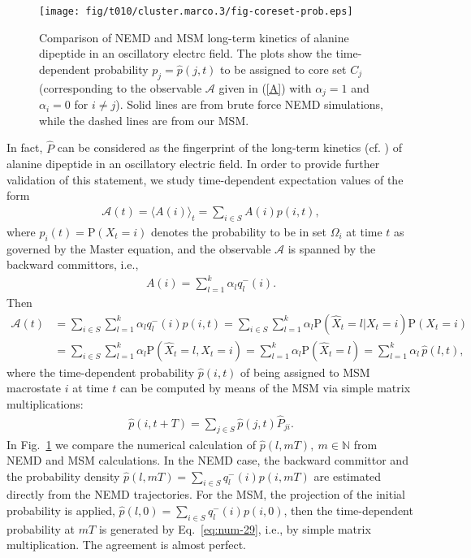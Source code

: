 \documentclass[aps, pre, preprint,unsortedaddress,a4paper,onecolumn]{revtex4}
\newcommand{\bwd}[0]{-}
\newcommand{\prob}{\textrm{P}}
\begin{document}
\begin{figure}
  \centering
  \texttt{[image: fig/t010/cluster.marco.3/fig-coreset-prob.eps]}
  \caption{Comparison of NEMD and MSM long-term kinetics of alanine dipeptide in an oscillatory electrc field. The plots show the time-dependent probability $p_j=\hat p(j,t)$ to be assigned to core set $C_j$ (corresponding to the observable $\mathcal A$ given in (\ref{A}) with $\alpha_j=1$ and $\alpha_i=0$ for $i\not= j$). Solid lines are from brute force NEMD simulations, while the dashed lines are from our MSM.}
  \label{fig:num-7}
\end{figure}

In fact, $\hat{P}$ can be considered as the fingerprint of the long-term kinetics (cf. \cite{A19-39,PrinzKellerNoe_PCCP11_Perspective}) of alanine dipeptide in an oscillatory electric field.
In order to provide further validation of this statement, we study  time-dependent expectation values of
the form
\begin{align}
  \mathcal A(t) = \langle A(i)\rangle_t = \sum_{i\in S} A(i) p(i,t),
\end{align}
where $p_i(t)=\prob(X_t=i)$ denotes the probability to be in set $\Omega_i$ at time $t$ as governed by the Master equation, and the observable $\mathcal A$ is spanned by the backward
committors, i.e.,
\begin{align}\label{A}
  A(i) = \sum_{l=1}^k \alpha_l q^\bwd_l(i).
\end{align}
Then
\begin{align}\nonumber
  \mathcal A(t) &=
  \sum_{i\in S} \sum_{l=1}^k \alpha_l q^\bwd_l(i)  p(i,t)=\sum_{i\in S} \sum_{l=1}^k \alpha_l \prob (\hat X_t = l \vert X_t = i) \prob (X_t = i) \\
  & =
  \sum_{i\in S} \sum_{l=1}^k \alpha_l \prob (\hat X_t = l ,X_t = i)  =
  \sum_{l=1}^k \alpha_l \prob (\hat X_t = l) 
 =
   \sum_{l=1}^k \alpha_l \,\hat p (l, t), \label{eq:num-28}
\end{align}
where the time-dependent probability $\hat{p}(i,t)$ of being assigned to MSM macrostate $i$ at time $t$ can be computed  by means of the MSM via simple matrix multiplications:
\begin{align}\label{eq:num-29}
  \hat p(i, t+T) = \sum_{j\in S} \hat p(j,t)\hat P_{ji}.
\end{align}
In Fig.~\ref{fig:num-7} we compare the numerical calculation of $\hat p (l, mT), \ m\in\mathbb N$ from NEMD and MSM calculations.
In the NEMD case, the backward committor and the probability density $\hat p (l, mT) = \sum_{i\in S}  q^\bwd_l(i)  p(i,mT) $
are estimated directly from the
NEMD trajectories. For the MSM, the projection of the initial probability is applied, $\hat p (l, 0) = \sum_{i\in S}  q^\bwd_l(i)  p(i,0) $, then
the time-dependent probability at $mT$ is generated by Eq.~\eqref{eq:num-29}, i.e., by simple matrix multiplication. The agreement is almost perfect.
\end{document}
